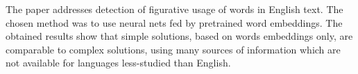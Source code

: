 The paper addresses detection of figurative usage of words in English text. The chosen method was to use neural nets fed by pretrained word embeddings. The obtained results show that simple solutions, based on words embeddings only, are comparable to complex solutions, using many sources of information which are not available for languages less-studied than English.
